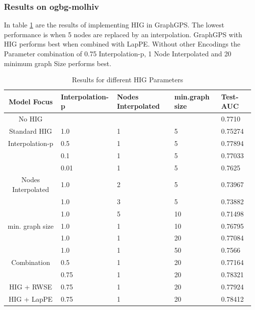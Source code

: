 \subsubsection{Results on ogbg-molhiv}
In table \ref{hig_results} are the results of implementing HIG in GraphGPS. The lowest performance is when 5 nodes are replaced by an interpolation. GraphGPS with HIG performs best when combined with LapPE\cite{2023graphgps}. Without other Encodings the Parameter combination of 0.75 Interpolation-p, 1 Node Interpolated and 20 minimum graph Size performs best.
\begin{table}[ht!]
    \centering
    \caption{Results for different HIG Parameters}
    \label{hig_results}
    \begin{tabular}{c || l|l|l|l|}
        Model Focus        & Interpolation-p & Nodes Interpolated & min.graph size & Test-AUC \\
        \hline
        \hline
        No HIG             &                 &                    &                & 0.7710   \\
        \hline
        Standard HIG       & 1.0             & 1                  & 5              & 0.75274  \\
        \hline
        Interpolation-p    & 0.5             & 1                  & 5              & 0.77894  \\
                           & 0.1             & 1                  & 5              & 0.77033  \\
                           & 0.01            & 1                  & 5              & 0.7625   \\
        \hline
        Nodes Interpolated & 1.0             & 2                  & 5              & 0.73967  \\
                           & 1.0             & 3                  & 5              & 0.73882  \\
                           & 1.0             & 5                  & 10             & 0.71498  \\
        \hline
        min. graph size    & 1.0             & 1                  & 10             & 0.76795  \\
                           & 1.0             & 1                  & 20             & 0.77084  \\
                           & 1.0             & 1                  & 50             & 0.7566   \\
        \hline
        Combination        & 0.5             & 1                  & 20             & 0.77164  \\
                           & 0.75            & 1                  & 20             & 0.78321  \\
        \hline
        HIG + RWSE         & 0.75            & 1                  & 20             & 0.77924  \\
        \hline
        HIG + LapPE        & 0.75            & 1                  & 20             & 0.78412  \\
    \end{tabular}
\end{table}



